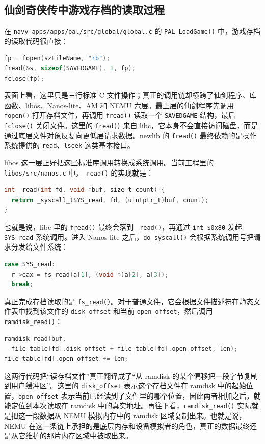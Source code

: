 \documentclass[a4paper]{article}
\begin{document}
\subsection{仙剑奇侠传中游戏存档的读取过程}
在 \texttt{navy-apps/apps/pal/src/global/global.c} 的 \texttt{PAL\_LoadGame()} 中，游戏存档的读取代码很直接：
\begin{lstlisting}[language=C]
fp = fopen(szFileName, "rb");
fread(&s, sizeof(SAVEDGAME), 1, fp);
fclose(fp);
\end{lstlisting}

表面上看，这里只是三行标准 C 文件操作；真正的调用链却横跨了仙剑程序、库函数、libos、Nanos-lite、AM 和 NEMU 六层。最上层的仙剑程序先调用 \texttt{fopen()} 打开存档文件，再调用 \texttt{fread()} 读取一个 \texttt{SAVEDGAME} 结构，最后 \texttt{fclose()} 关闭文件。这里的 \texttt{fread()} 来自 libc，它本身不会直接访问磁盘，而是通过底层文件对象反复向更低层请求数据。newlib 的 \texttt{fread()} 最终依赖的是操作系统提供的 \texttt{read}、\texttt{lseek} 这类基本接口。

libos 这一层正好把这些标准库调用转换成系统调用。当前工程里的 \texttt{libos/src/nanos.c} 中，\texttt{\_read()} 的实现就是：
\begin{lstlisting}[language=C]
int _read(int fd, void *buf, size_t count) {
  return _syscall_(SYS_read, fd, (uintptr_t)buf, count);
}
\end{lstlisting}

也就是说，libc 里的 \texttt{fread()} 最终会落到 \texttt{\_read()}，再通过 \texttt{int \$0x80} 发起 \texttt{SYS\_read} 系统调用。进入 Nanos-lite 之后，\texttt{do\_syscall()} 会根据系统调用号把请求分发给文件系统：
\begin{lstlisting}[language=C]
case SYS_read:
  r->eax = fs_read(a[1], (void *)a[2], a[3]);
  break;
\end{lstlisting}

真正完成存档读取的是 \texttt{fs\_read()}。对于普通文件，它会根据文件描述符在静态文件表中找到该文件的 \texttt{disk\_offset} 和当前 \texttt{open\_offset}，然后调用 \texttt{ramdisk\_read()}：
\begin{lstlisting}[language=C]
ramdisk_read(buf,
  file_table[fd].disk_offset + file_table[fd].open_offset, len);
file_table[fd].open_offset += len;
\end{lstlisting}

这两行代码把“读存档文件”真正翻译成了“从 ramdisk 的某个偏移把一段字节复制到用户缓冲区”。这里的 \texttt{disk\_offset} 表示这个存档文件在 ramdisk 中的起始位置，\texttt{open\_offset} 表示当前已经读到了文件里的哪个位置，因此两者相加之后，就能定位到本次读取在 ramdisk 中的真实地址。再往下看，\texttt{ramdisk\_read()} 实际就是把这一段数据从 NEMU 模拟内存中的 ramdisk 区域复制出来。也就是说，NEMU 在这一条链上承担的是底层内存和设备模拟者的角色，真正的数据最终还是从它维护的那片内存区域中被取出来。
\end{document}
